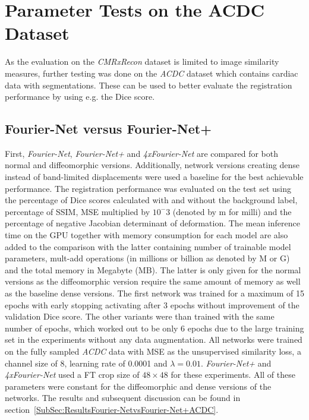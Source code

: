 \documentclass[english,version-2022-01]{uzl-thesis} %
\begin{document}
\section{Parameter Tests on the ACDC Dataset}
As the evaluation on the \emph{CMRxRecon} dataset is limited to image similarity measures, further testing was done on the \emph{ACDC} dataset which contains cardiac data with segmentations. These can be used to better evaluate the registration performance by using e.g. the Dice score.


\subsection{Fourier-Net versus Fourier-Net+} \label{SubSec:Fourier-NetvsFourier-Net+}
First, \emph{Fourier-Net}, \emph{Fourier-Net+} and \emph{4xFourier-Net} are compared for both normal and diffeomorphic versions. Additionally, network versions creating dense instead of band-limited displacements were used a baseline for the best achievable performance. The registration performance was evaluated on the test set using the percentage of Dice scores calculated with and without the background label, percentage of SSIM, MSE multiplied by $10^-3$ (denoted by m for milli) and the percentage of negative Jacobian determinant of deformation. The mean inference time on the GPU together with memory consumption for each model are also added to the comparison with the latter containing number of trainable model parameters, mult-add operations (in millions or billion as denoted by M or G) and the total memory in Megabyte (MB). The latter is only given for the normal versions as the diffeomorphic version require the same amount of memory as well as the baseline dense versions. The first network was trained for a maximum of 15 epochs with early stopping activating after 3 epochs without improvement of the validation Dice score. The other variants were than trained with the same number of epochs, which worked out to be only 6 epochs due to the large training set in the experiments without any data augmentation. All networks were trained on the fully sampled \emph{ACDC} data with MSE as the unsupervised similarity loss, a channel size of 8, learning rate of 0.0001 and $\lambda=0.01$. \emph{Fourier-Net+} and \emph{4xFourier-Net} used a FT crop size of $48 \times 48$ for these experiments. All of these parameters were constant for the diffeomorphic and dense versions of the networks. The results and subsequent discussion can be found in section~\ref{SubSec:ResultsFourier-NetvsFourier-Net+ACDC}.
\end{document}
